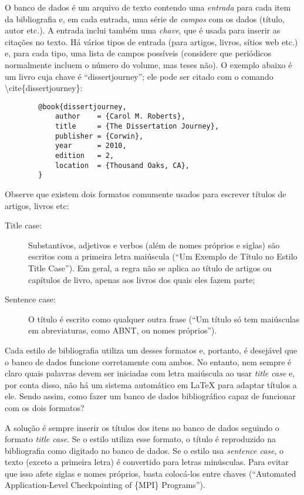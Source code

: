 O banco de dados é um arquivo de texto contendo uma \emph{entrada} para cada
item da bibliografia e, em cada entrada, uma série de \emph{campos} com os
dados (título, autor etc.). A entrada inclui também uma \emph{chave}, que é
usada para inserir as citações no texto. Há vários tipos de entrada (para
artigos, livros, sítios web etc.) e, para cada tipo, uma lista de campos
possíveis (considere que periódicos normalmente incluem o número do volume,
mas teses não). O exemplo abaixo é um livro cuja chave é ``dissertjourney'';
ele pode ser citado com o comando \textsf{\textbackslash{}cite\{dissertjourney\}}:

\begin{verbatim}
        @book{dissertjourney,
            author    = {Carol M. Roberts},
            title     = {The Dissertation Journey},
            publisher = {Corwin},
            year      = 2010,
            edition   = 2,
            location  = {Thousand Oaks, CA},
        }
\end{verbatim}

Observe que existem dois formatos comumente usados para escrever títulos
de artigos, livros etc:

\begin{description}
  \item[Title case:] Substantivos, adjetivos e verbos (além de nomes
  próprios e siglas) são escritos com a primeira letra maiúscula (``Um
  Exemplo de Título no Estilo Title Case''). Em geral, a regra não se
  aplica ao título de artigos ou capítulos de livro, apenas aos livros
  dos quais eles fazem parte;

  \item[Sentence case:] O título é escrito como qualquer outra frase
  (``Um título só tem maiúsculas em abreviaturas, como ABNT, ou nomes
  próprios'').
\end{description}

Cada estilo de bibliografia utiliza um desses formatos e, portanto, é
desejável que o banco de dados funcione corretamente com ambos. No
entanto, nem sempre é claro quais palavras devem ser iniciadas com letra
maiúscula ao usar \textit{title case} e, por conta disso, não há um sistema
automático em \LaTeX{} para adaptar títulos a ele. Sendo assim, como fazer
um banco de dados bibliográfico capaz de funcionar com os dois formatos?

A solução é sempre inserir os títulos dos itens no banco de dados seguindo
o formato \textit{title case}. Se o estilo utiliza esse formato, o título
é reproduzido na bibliografia como digitado no banco de dados. Se o estilo
usa \textit{sentence case}, o texto (exceto a primeira letra) é convertido
para letras minúsculas. Para evitar que isso afete siglas e nomes próprios,
basta colocá-los entre chaves (``Automated Application-Level Checkpointing
of \{MPI\} Programs'').

